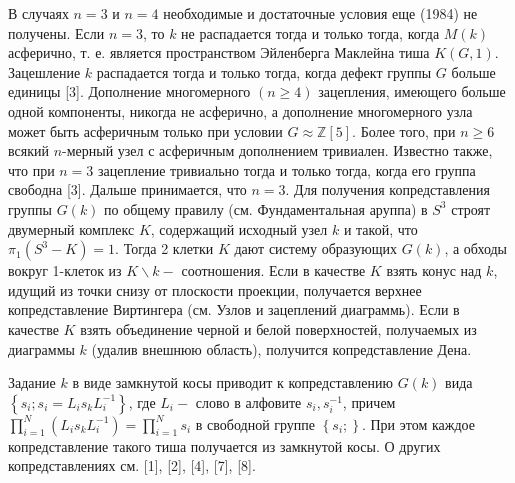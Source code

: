 \documentclass[10pt]{article}
\begin{document}
В случаях $n=3$ и $n=4$ необходимые и достаточные условия еще (1984) не получены. Если $n=3$, то $k$ не распадается тогда и только тогда, когда $M(k)$ асферично, т. е. является пространством Эйленберга Маклейна тиша $K(G, 1)$. Зацешление $k$ распадается тогда и только тогда, когда дефект группы $G$ больше единицы [3]. Дополнение многомерного $(n \geqslant 4)$ зацепления, имеющего больше одной компоненты, никогда не асферично, а дополнение многомерного узла может быть асферичным только при условии $G \approx \mathbb{Z}[5]$. Более того, при $n \geqslant 6$ всякий $n$-мерный узел с асферичным дополнением тривиален. Известно также, что при $n=3$ зацепление тривиально тогда и только тогда, когда его группа свободна [3]. Дальше принимается, что $n=3$. Для получения копредставления группы $G(k)$ по общему правилу (см. Фундаментальная аруппа) в $S^{3}$ строят двумерный комплекс $K$, содержащий исходный узел $k$ и такой, что $\pi_{1}\left(S^{3}-K\right)=1$. Тогда 2 клетки $K$ дают систему образующих $G(k)$, а обходы вокруг 1-клеток из $K \backslash k-$ соотношения. Если в качестве $K$ взять конус над $k$, идущий из точки снизу от плоскости проекции, получается верхнее копредставление Виртингера (см. Узлов и зацеплений диаграммь). Если в качестве $K$ взять объединение черной и белой поверхностей, получаемых из диаграммы $k$ (удалив внешнюю область), получится копредставление Дена.



Задание $k$ в виде замкнутой косы приводит к копредставлению $G(k)$ вида $\left\{s_{i} ; s_{i}=L_{i} s_{k} L_{i}^{-1}\right\}$, где $L_{i}-$ слово в алфовите $s_{i}, s_{i}^{-1}$, причем $\prod_{i=1}^{N}\left(L_{i} s_{k} L_{i}^{-1}\right)=\prod_{i=1}^{N} s_{i}$ в свободной группе $\left\{s_{i} ;\right\}$. При этом каждое копредставление такого тиша получается из замкнутой косы. О других копредставлениях см. [1], [2], [4], [7], [8].
\end{document}
